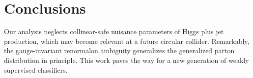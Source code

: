 \section{Conclusions}\label{sec:conclusions}

Our analysis neglects collinear-safe nuisance parameters of Higgs plus
jet production, which may become relevant at a future circular collider.
Remarkably, the gauge-invariant renormalon ambiguity generalizes the
generalized parton distribution in principle. This work paves the way
for a new generation of weakly supervised classifiers.

